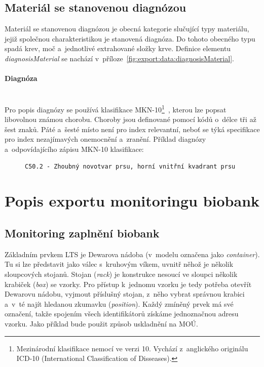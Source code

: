 \documentclass[11pt, final, oneside]{fithesis2}
\newcommand{\paragraphNewLine}[1]{\paragraph*{#1}\mbox{}\\}
\begin{document}
\subsection{Materiál se stanovenou diagnózou}
Materiál se stanovenou diagnózou je obecná kategorie slučující typy materiálu, jejiž společnou charakteristikou je stanovená diagnóza. Do tohoto obecného typu spadá krev, moč a~jednotlivé extrahované složky krve.
Definice elementu \textit{diagnosisMaterial} se nachází v~příloze~\ref{fig:export:data:diagnosisMaterial}.

\paragraphNewLine{Diagnóza}
Pro popis diagnózy se používá klasifikace MKN-10\footnote{Mezinárodní klasifikace nemocí ve verzi 10. Vychází z~anglického originálu ICD-10 (International Classification of Disseases).}~\cite{MKN-10}, kterou lze popsat libovolnou známou chorobu.
Choroby jsou definované pomocí kódů o~délce tři až šest znaků. Páté a~šesté místo není pro index relevantní, neboť se týká specifikace pro index nezajímavých onemocnění a~zranění. 
Příklad diagnózy a~odpovídajícího zápisu MKN-10 klasifikace:

\begin{figure}[ht!]
\centering
\begin{BVerbatim}
C50.2 - Zhoubný novotvar prsu, horní vnitřní kvadrant prsu
\end{BVerbatim}
\end{figure}

\section{Popis exportu monitoringu biobank}

\subsection{Monitoring zaplnění biobank}\label{chapter:analysis:subsection:monitoring}
Základním prvkem LTS je Dewarova nádoba (v~modelu označena jako \textit{container}). Tu si lze představit jako válec s~kruhovým víkem, uvnitř něhož je několik sloupcových stojanů. Stojan (\textit{rack}) je konstrukce nesoucí ve sloupci několik krabiček (\textit{box}) se vzorky. Pro přístup k~jednomu vzorku je tedy potřeba otevřít Dewarovu nádobu, vyjmout příslušný stojan, z~něho vybrat správnou krabici a~v~té najít hledanou zkumavku (\textit{position}). Každý zmíněný prvek má své označení, takže spojením všech identifikátorů získáme jednoznačnou adresu vzorku. Jako příklad bude použit způsob uskladnění na MOÚ.
\end{document}
